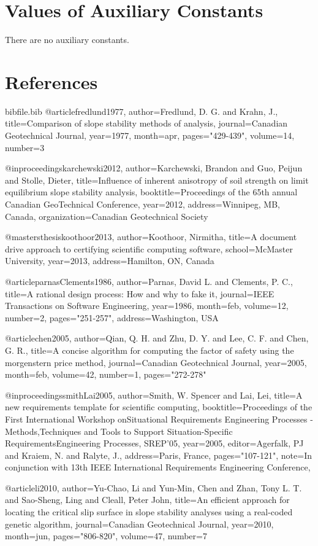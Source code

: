 \documentclass[12pt]{article}
\begin{document}
\section{Values of Auxiliary Constants}
\label{Sec:AuxConstants}
There are no auxiliary constants.
\section{References}
\label{Sec:References}
\begin{filecontents*}{bibfile.bib}
@article{fredlund1977,
author={Fredlund, D. G. and Krahn, J.},
title={Comparison of slope stability methods of analysis},
journal={Canadian Geotechnical Journal},
year={1977},
month={apr},
pages={"429-439"},
volume={14},
number={3}}

@inproceedings{karchewski2012,
author={Karchewski, Brandon and Guo, Peijun and Stolle, Dieter},
title={Influence of inherent anisotropy of soil strength on limit equilibrium slope stability analysis},
booktitle={Proceedings of the 65th annual Canadian GeoTechnical Conference},
year={2012},
address={Winnipeg, MB, Canada},
organization={Canadian Geotechnical Society}}

@mastersthesis{koothoor2013,
author={Koothoor, Nirmitha},
title={A document drive approach to certifying scientific computing software},
school={McMaster University},
year={2013},
address={Hamilton, ON, Canada}}

@article{parnasClements1986,
author={Parnas, David L. and Clements, P. C.},
title={A rational design process: How and why to fake it},
journal={IEEE Transactions on Software Engineering},
year={1986},
month={feb},
volume={12},
number={2},
pages={"251-257"},
address={Washington, USA}}

@article{chen2005,
author={Qian, Q. H. and Zhu, D. Y. and Lee, C. F. and Chen, G. R.},
title={A concise algorithm for computing the factor of safety using the morgenstern price method},
journal={Canadian Geotechnical Journal},
year={2005},
month={feb},
volume={42},
number={1},
pages={"272-278"}}

@inproceedings{smithLai2005,
author={Smith, W. Spencer and Lai, Lei},
title={A new requirements template for scientific computing},
booktitle={Proceedings of the First International Workshop onSituational Requirements Engineering Processes - Methods,Techniques and Tools to Support Situation-Specific RequirementsEngineering Processes, SREP'05},
year={2005},
editor={Agerfalk, PJ and Kraiem, N. and Ralyte, J.},
address={Paris, France},
pages={"107-121"},
note={In conjunction with 13th IEEE International Requirements Engineering Conference,}}

@article{li2010,
author={Yu-Chao, Li and Yun-Min, Chen and Zhan, Tony L. T. and Sao-Sheng, Ling and Cleall, Peter John},
title={An efficient approach for locating the critical slip surface in slope stability analyses using a real-coded genetic algorithm},
journal={Canadian Geotechnical Journal},
year={2010},
month={jun},
pages={"806-820"},
volume={47},
number={7}}
\end{filecontents*}
\nocite{*}
\printbibliography[heading=none]
\end{document}
